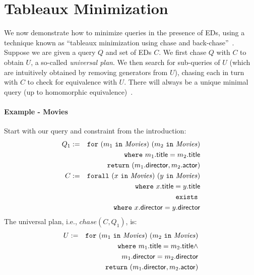 \documentclass[preprint]{sigplanconf}
\newcommand{\FOR}{{\tt for}\relax\ifmmode\ \else\xspace\fi}
\newcommand{\FORALL}{{\tt forall}\relax\ifmmode\ \else\xspace\fi}
\newcommand{\EXISTS}{{\tt exists}\relax\ifmmode\ \else\xspace\fi}
\newcommand{\WHERE}{{\tt where}\relax\ifmmode\ \else\xspace\fi}
\newcommand{\IN}{ \ {\tt in} \ }
\newcommand{\RETURN}{{\tt return}\relax\ifmmode\ \else\xspace\fi}
\newcommand{\relation}[1]{\ensuremath{\mathit{#1}}\xspace}
\begin{document}
\section{Tableaux Minimization}
\label{sec:minimize}

We now demonstrate how to minimize queries in the presence of EDs, using a technique known as ``tableaux minimization using chase and back-chase''~\cite{Deutsch:2006:QRC:1121995.1122010}.
Suppose we are given a query $Q$ and set of EDs $C$.
We first chase $Q$ with $C$ to obtain $U$, a so-called {\it universal plan}.
We then search for sub-queries of $U$ (which are intuitively obtained by removing generators from $U$), chasing each in turn with $C$ to check for equivalence with $U$.
There will always be a unique minimal query (up to homomorphic equivalence)~\cite{Deutsch:2006:QRC:1121995.1122010}.

\paragraph{Example - Movies}
Start with our query and constraint from the introduction:
\begin{eqnarray*}
Q_1 & := & \FOR (m_1 \IN \relation{Movies}) \ (m_2 \IN \relation{Movies}) \\
 & & \WHERE m_1.{\sf title} = m_2.{\sf title} \\
 & & \RETURN (m_1.{\sf director}, m_2.{\sf actor}) \\
C & := & \FORALL (x \IN \relation{Movies}) \ (y \IN \relation{Movies}) \\
& & \WHERE x.{\sf title} = y.{\sf title} \\
& & \EXISTS \\
& & \WHERE x.{\sf director} = y.{\sf director}
\end{eqnarray*}
The universal plan, i.e., $chase(C,Q_1)$, is:
\begin{eqnarray*}
U & := & \FOR (m_1 \IN \relation{Movies}) \ (m_2 \IN \relation{Movies}) \\
 & & \WHERE m_1.{\sf title} = m_2.{\sf title} \wedge \\
 & & \qquad\quad m_1.{\sf director} = m_2.{\sf 
director} \\
 & & \RETURN (m_1.{\sf director}, m_2.{\sf actor})
\end{eqnarray*}
\end{document}
